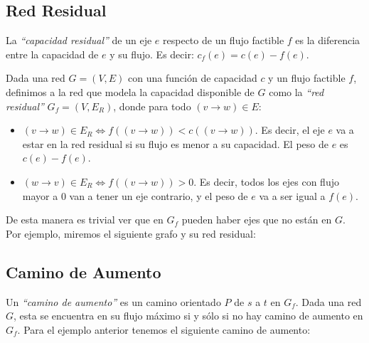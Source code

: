 
\subsection{Red Residual}

La \emph{``capacidad residual''} de un eje $e$ respecto de un flujo factible $f$ es la diferencia entre la capacidad de $e$ y su flujo. Es decir: $c_f(e) = c(e) - f(e)$.

Dada una red $G = (V, E)$ con una funci\'on de capacidad $c$ y un flujo factible $f$, definimos a la red que modela la capacidad disponible de $G$ como la \emph{``red residual''} $G_f = (V, E_{R})$, donde para todo $(v \rightarrow w) \in E$:

\begin{itemize}
\item $(v \rightarrow w) \in E_R \Longleftrightarrow f((v \rightarrow w)) < c((v \rightarrow w))$. Es decir, el eje $e$ va a estar en la red residual si su flujo es menor a su capacidad. El peso de $e$ es $c(e) - f(e)$.
\item $(w \rightarrow v) \in E_R \Longleftrightarrow f((v \rightarrow w)) > 0$. Es decir, todos los ejes con flujo mayor a $0$ van a tener un eje contrario, y el peso de $e$ va a ser igual a $f(e)$.
\end{itemize}



De esta manera es trivial ver que en $G_f$ pueden haber ejes que no est\'an en $G$. Por ejemplo, miremos el siguiente grafo y su red residual:

\begin{figure}[htb]
    \centering
    
\end{figure}


\newpage
\subsection{Camino de Aumento}

Un \emph{``camino de aumento''} es un camino orientado $P$ de $s$ a $t$ en $G_f$. Dada una red $G$, esta se encuentra en su flujo m\'aximo si y s\'olo si no hay camino de aumento en $G_f$. Para el ejemplo anterior tenemos el siguiente camino de aumento:

\begin{figure}[htb]
    \centering
    
\end{figure}

